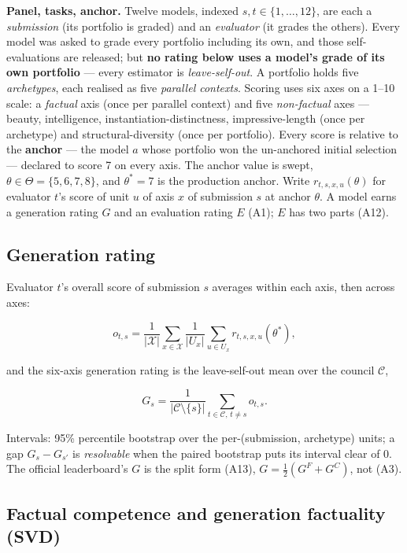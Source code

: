 \documentclass{article}
\begin{document}
\textbf{Panel, tasks, anchor.} Twelve models, indexed \(s,t\in\{1,\dots,12\}\), are each a \emph{submission} (its portfolio is graded) and an \emph{evaluator} (it grades the others). Every model was asked to grade every portfolio including its own, and those self-evaluations are released; but \textbf{no rating below uses a model's grade of its own portfolio} --- every estimator is \emph{leave-self-out}. A portfolio holds five \emph{archetypes}, each realised as five \emph{parallel contexts}. Scoring uses six axes on a 1--10 scale: a \emph{factual} axis (once per parallel context) and five \emph{non-factual} axes --- beauty, intelligence, instantiation-distinctness, impressive-length (once per archetype) and structural-diversity (once per portfolio). Every score is relative to the \textbf{anchor} --- the model \(a\) whose portfolio won the un-anchored initial selection --- declared to score 7 on every axis. The anchor value is swept, \(\theta\in\Theta=\{5,6,7,8\}\), and \(\theta^{*}=7\) is the production anchor. Write \(r_{t,s,x,u}(\theta)\) for evaluator \(t\)'s score of unit \(u\) of axis \(x\) of submission \(s\) at anchor \(\theta\). A model earns a generation rating \(G\) and an evaluation rating \(E\) (A1); \(E\) has two parts (A12).

\subsection{Generation rating}\label{generation-rating}

Evaluator \(t\)'s overall score of submission \(s\) averages within each axis, then across axes:

\[ o_{t,s}=\frac{1}{|\mathcal{X}|}\sum_{x\in\mathcal{X}}\frac{1}{|U_x|}\sum_{u\in U_x} r_{t,s,x,u}(\theta^{*}), \tag{A2}\]

and the six-axis generation rating is the leave-self-out mean over the council \(\mathcal{C}\),

\[ G_s=\frac{1}{|\mathcal{C}\setminus\{s\}|}\sum_{t\in\mathcal{C},\,t\ne s} o_{t,s}. \tag{A3}\]

Intervals: 95\% percentile bootstrap over the per-(submission, archetype) units; a gap \(G_s-G_{s'}\) is \emph{resolvable} when the paired bootstrap puts its interval clear of 0. The official leaderboard's \(G\) is the split form (A13), \(G=\tfrac12(G^{F}+G^{C})\), not (A3).

\subsection{Factual competence and generation factuality (SVD)}\label{factual-competence-and-generation-factuality-svd}
\end{document}
